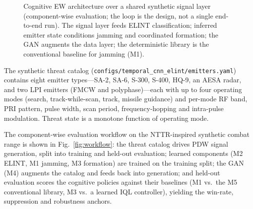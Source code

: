 \documentclass[journal]{IEEEtran}
\begin{document}
\begin{figure}[t]
\centering
{}
\caption{Cognitive EW architecture over a shared synthetic signal layer (component-wise
evaluation; the loop is the design, not a single end-to-end run). The signal layer feeds ELINT
classification; inferred emitter state conditions jamming and coordinated formation; the GAN
augments the data layer; the deterministic library is the conventional baseline for jamming (M1).}
\label{fig:arch}
\end{figure}

The synthetic threat catalog (\texttt{configs/temporal\_cnn\_elint/emitters.yaml}) contains
eight emitter types---SA-2, SA-6, S-300, S-400, HQ-9, an AESA radar, and two LPI emitters
(FMCW and polyphase)---each with up to four operating modes (search, track-while-scan, track,
missile guidance) and per-mode RF band, PRI pattern, pulse width, scan period, frequency-hopping
and intra-pulse modulation. Threat state is a monotone function of operating mode.

The component-wise evaluation workflow on the NTTR-inspired synthetic combat range is shown in
Fig.~\ref{fig:workflow}: the threat catalog drives PDW signal generation, split into
training and held-out evaluation; learned components (M2 ELINT, M1 jamming, M3 formation) are
trained on the training split; the GAN (M4) augments the catalog and feeds back into generation;
and held-out evaluation scores the cognitive policies against their baselines (M1 vs.\ the M5
conventional library, M3 vs.\ a learned IQL controller), yielding the win-rate, suppression and
robustness anchors.
\end{document}
